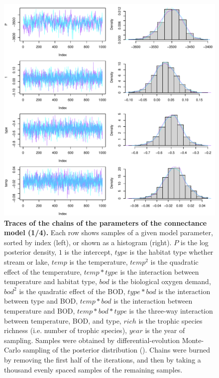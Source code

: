 \documentclass[11pt, oneside]{article}
\begin{document}
\begin{figure}[H]
\begin{center}
\includegraphics[page=1, width=1\linewidth]{b0_6_2/out_con/fig_tracePlot_beta.pdf}
\caption{
    \textbf{Traces of the chains of the parameters of the connectance model (1/4).}
    Each row shows samples of a given model parameter, sorted by index (left), or shown as a histogram (right).
    $P$ is the log posterior density, $1$ is the intercept, $type$ is the habitat type whether stream or lake, $temp$ is the temperature, $temp^2$ is the quadratic effect of the temperature, $temp * type$ is the interaction between temperature and habitat type, $bod$ is the biological oxygen demand, $bod^2$ is the quadratic effect of the BOD, $type * bod$ is the interaction between type and BOD, $temp * bod$ is the interaction between temperature and BOD, $temp * bod * type$ is the three-way interaction between temperature, BOD, and type, $rich$ is the trophic species richness (i.e. number of trophic species), $year$ is the year of sampling.
    Samples were obtained by differential-evolution Monte-Carlo sampling of the posterior distribution (\cite{TerBraak2006}).
    Chains were burned by removing the first half of the iterations, and then by taking a thousand evenly spaced samples of the remaining samples.
} 
\end{center}
\end{figure}
\end{document}
